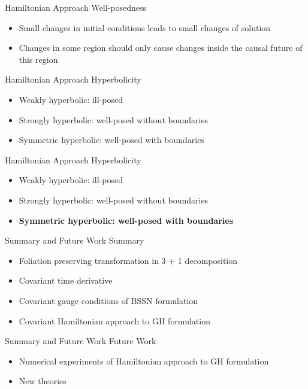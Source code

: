 \documentclass[xcolor=dvipsnames]{beamer}
\begin{document}
	\begin{frame}{Hamiltonian Approach}
		Well-posedness
		\begin{itemize}
			\pause
			\item{Small changes in initial conditions leads to small changes of solution}
			\pause
			\item{Changes in some region should only cause changes inside the causal future of this region}
		\end{itemize}
	\end{frame}
	\begin{frame}{Hamiltonian Approach}
		Hyperbolicity
		\begin{itemize}
			\item{Weakly hyperbolic: ill-posed}
			\item{Strongly hyperbolic: well-posed without boundaries}
			\item{Symmetric hyperbolic: well-posed with boundaries}
		\end{itemize}
	\end{frame}
	\begin{frame}{Hamiltonian Approach}
		Hyperbolicity
		\begin{itemize}
			\item{Weakly hyperbolic: ill-posed}
			\item{Strongly hyperbolic: well-posed without boundaries}
			\item{\textbf{{\color{red}Symmetric hyperbolic: well-posed with boundaries}}}
		\end{itemize}
	\end{frame}
	\begin{frame}{Summary and Future Work}
		Summary
		\begin{itemize}
			\item{Foliation preserving transformation in 3 + 1 decomposition}
			\item{Covariant time derivative}
			\item{Covariant gauge conditions of BSSN formulation}
			\item{Covariant Hamiltonian approach to GH formulation}
		\end{itemize}
	\end{frame}
	\begin{frame}{Summary and Future Work}
		Future Work
		\begin{itemize}
			\item{Numerical experiments of Hamiltonian approach to GH formulation}
			\item{New theories}
		\end{itemize}
	\end{frame}
\end{document}
